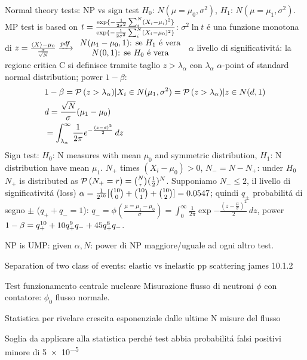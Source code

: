 \documentclass[asd-beamer.tex]{subfiles}
\begin{document}
\begin{wordonframe}{Normal theory tests: NP vs sign test}
$H_0$: $N(\mu=\mu_0,\sigma^2)$, $H_1$: $N(\mu=\mu_1,\sigma^2)$.
MP test is based on $t=\frac{\text{exp}\{-\frac{1}{2\sigma^2}\sum_i^N(X_i-\mu_i)^2\}}{\text{exp}\{-\frac{1}{2\sigma^2}\sum_i^N(X_i-\mu_0)^2\}}$: $\sigma^2\ln{t}$ \'e una funzione monotona di $z=\frac{\langle X \rangle-\mu_0}{\frac{\sigma}{\sqrt{N}}}\xrightarrow{pdf}\begin{array}{c}N(\mu_1-\mu_0,1) \text{: se $H_1$ \'e vera}\\
N(0,1) \text{: se $H_0$ \'e vera}
\end{array}$
$\alpha$ livello di significativit\'a: la regione critica C si definisce tramite taglio $z>\lambda_{\alpha}$ con $\lambda_{\alpha}$ $\alpha$-point of standard normal distribution; power $1-\beta$:
\begin{align*}
&1-\beta=\operatorname{\mathcal{P}}{(z>\lambda_{\alpha})|X_i\in N(\mu_1,\sigma^2)}=\operatorname{\mathcal{P}}{(z>\lambda_{\alpha})|z\in N(d,1)}\\
&d=\frac{\sqrt{N}}{\sigma}(\mu_1-\mu_0)\\
&=\int_{\lambda_{\alpha}}^{\infty}\frac{1}{2\pi}e^{-\frac{(z-d)^2}{2}}\,dz
\end{align*}
Sign test:
$H_0$: N measures with mean $\mu_0$ and symmetric distribution, $H_1$: N distribution have mean $\mu_1$. $N_+$ times $(X_i-\mu_0)>0$, $N_-=N-N_+$: under $H_0$ $N_+$ is distributed as $\operatorname{\mathcal{P}}{(N_+=r)}=\binom{N}{r}(\frac{1}{2})^N$. Supponiamo $N_-\leq2$, il livello di significativit\'a  (loss) $\alpha=\frac{1}{2^{10}}[\binom{10}{0}+\binom{10}{1}+\binom{10}{2}]=0.0547$; quindi $q_{\pm}$ probabilit\'a di segno $\pm$ ($q_++q_-=1$): $q_-=\phi(\frac{\mu=\mu_1-\mu_0}{\sigma})=\int_0^{\infty}\frac{1}{2\pi}\exp{-\frac{(z-\frac{\mu}{\sigma})^2}{2}}\,dz$, power $1-\beta=q_+^{10}+10q_+^9q_-+45q_+^8q_-$.

NP is UMP: given $\alpha, N$: power di NP maggiore/uguale ad ogni altro test.
\end{wordonframe}

\begin{frame}{Separation of two class of events: elastic vs inelastic pp scattering}
james 10.1.2
\end{frame}

\begin{frame}{Test funzionamento centrale nucleare}\frameintoc
Misurazione flusso di neutroni $\phi$ con contatore: $\phi_0$ flusso normale.
\begin{block}{Statistica per rivelare crescita esponenziale dalle ultime N misure del flusso}

\end{block}
\begin{block}{Soglia da applicare alla statistica perch\'e test abbia probabilit\'a falsi positivi minore di \num{5e-5}}

\end{block}
\end{frame}
\end{document}
